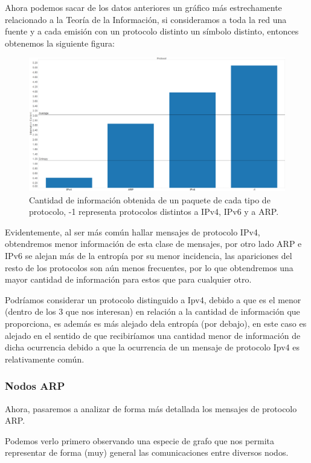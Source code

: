 \documentclass{article}
\theoremstyle{definition}
\theoremstyle{remark}
\begin{document}
Ahora podemos sacar de los datos anteriores un gráfico más estrechamente relacionado a la Teoría de la Información, si consideramos a toda la red una fuente y a cada emisión con un protocolo distinto un símbolo distinto, entonces obtenemos la siguiente figura:

\begin{figure}[H]
\centering
\includegraphics[width=450pt]{captures/LabosDC/Protocol PDF Dashboard.png}
\caption{Cantidad de información obtenida de un paquete de cada tipo de protocolo, -1 representa protocolos distintos a IPv4, IPv6 y a ARP.}
\end{figure}

Evidentemente, al ser más común hallar mensajes de protocolo IPv4, obtendremos menor información de esta clase de mensajes, por otro lado ARP e IPv6 se alejan más de la entropía por su menor incidencia, las apariciones del resto de los protocolos son aún menos frecuentes, por lo que obtendremos una mayor cantidad de información para estos que para cualquier otro.

Podríamos considerar un protocolo distinguido a Ipv4, debido a que es el menor (dentro de los 3 que nos interesan) en relación a la cantidad de información que proporciona, es además es más alejado dela entropía (por debajo), en este caso es alejado en el sentido de que recibiríamos una cantidad menor de información de dicha ocurrencia debido a que la ocurrencia de un mensaje de protocolo Ipv4 es relativamente común.

\subsubsection{Nodos ARP}

Ahora, pasaremos a analizar de forma más detallada los mensajes de protocolo ARP.

Podemos verlo primero observando una especie de grafo que nos permita representar de forma (muy) general las comunicaciones entre diversos nodos.
\end{document}
